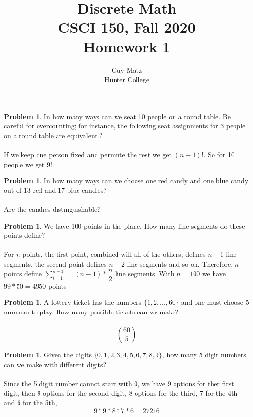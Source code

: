 \documentclass[10pt,leqno ]{article}
\title{Discrete Math\\
CSCI 150, Fall 2020\\
Homework 1}
\author{Guy Matz \\
Hunter College}
\theoremstyle{definition}
\newtheorem{problem}[theorem]{Problem}
\begin{document}
\begin{problem} In how many ways can we seat 10 people on a round table.  Be careful for overcounting; for instance, the following seat assignments for 3 people on a round table are equivalent.?\\
\\
If we keep one person fixed and permute the rest we get $(n-1)!$.  So for 10 people we get $9!$
\end{problem}
\newpage
\begin{problem} In how many ways can we choose one red candy and one blue candy out of 13 red and 17 blue candies?
\\\\
Are the candies distinguishable?
\end{problem}
\newpage

\begin{problem} We have 100 points in the plane.  How many line segments do these points define?
\\\\
\Large
For $n$ points, the first point, combined will all of the others, defines $n-1$ line segments, the second point defines $n-2$ line segments and so on.  Therefore, $n$ points define $\sum_{i=1}^{n-1} = (n-1)* \dfrac{n}{2}$ line segments.  With $n=100$ we have $99*50 = 4950$ points
\end{problem}
\newpage

\begin{problem} A  lottery  ticket  has  the  numbers $\{1,2, . . . ,60\}$ and  one  must  choose  5 numbers to play.  How many possible tickets can we make?
\\\\
\Large
$${60 \choose 5}$$
\end{problem}
\newpage

\begin{problem} Given the digits $\{0,1,2,3,4,5,6,7,8,9\}$, how many 5 digit numbers can we make with different digits?
\\\\
Since the 5 digit number cannot start with 0, we have 9 options for ther first digit, then 9 options for the second digit, 8 options for the third, 7 for the 4th and 6 for the 5th,
$$ 9 * 9 * 8 * 7 * 6 = 27216$$
\end{problem}
\newpage
\end{document}
